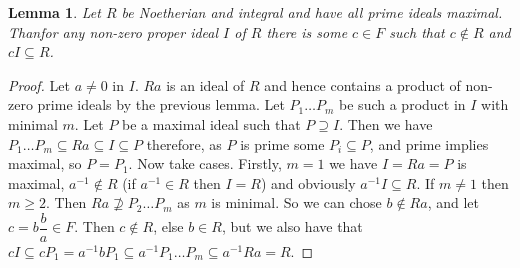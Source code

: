 \documentclass[a4paper,10pt]{article}
\newtheorem{lem}[thm]{Lemma}
\begin{document}
\begin{lem}
Let $R$ be Noetherian and integral and have all prime ideals maximal. Thanfor any non-zero proper ideal $I$ of $R$ there is some $c\in F$ such that $c\notin R$ and $cI\subseteq R$.
\end{lem}
\begin{proof}
Let $a\neq0$ in $I$. $Ra$ is an ideal of $R$ and hence contains a product of non-zero prime ideals by the previous lemma. Let $P_{1}\ldots P_{m}$ be such a product in $I$ with minimal $m$. Let $P$ be a maximal ideal such that $P\supseteq I$. Then we have $P_{1}\ldots P_{m}\subseteq Ra\subseteq I\subseteq P$ therefore, as $P$ is prime some $P_{i}\subseteq P$, and prime implies maximal, so $P=P_{1}$. Now take cases. Firstly, $m=1$ we have $I=Ra=P$ is maximal, $a^{-1}\notin R$ (if $a^{-1}\in R$ then $I=R$) and obviously $a^{-1}I\subseteq R$.
\newline If $m\neq 1$ then $m\geq 2$. Then $Ra\nsupseteq P_{2}\ldots P_{m}$ as $m$ is minimal. So we can chose $b\notin Ra$, and let $c=b\dfrac{b}{a}\in F$. Then $c\notin R$, else $b\in R$, but we also have that $cI\subseteq cP_{1}=a^{-1}bP_{1}\subseteq a^{-1}P_{1}\ldots P_{m}\subseteq a^{-1}Ra=R$.
\end{proof}
\end{document}
